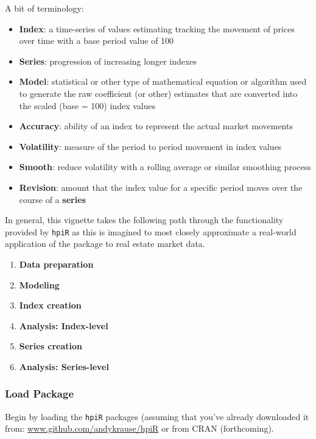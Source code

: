 \documentclass[]{article}
\providecommand{\tightlist}{%
  \setlength{\itemsep}{0pt}\setlength{\parskip}{0pt}}
\begin{document}
A bit of terminology:

\begin{itemize}
\tightlist
\item
  \textbf{Index}: a time-series of values estimating tracking the
  movement of prices over time with a base period value of 100
\item
  \textbf{Series}: progression of increasing longer indexes\\
\item
  \textbf{Model}: statistical or other type of mathematical equation or
  algorithm used to generate the raw coefficient (or other) estimates
  that are converted into the scaled (base = 100) index values
\item
  \textbf{Accuracy}: ability of an index to represent the actual market
  movements
\item
  \textbf{Volatility}: measure of the period to period movement in index
  values
\item
  \textbf{Smooth}: reduce volatility with a rolling average or similar
  smoothing process
\item
  \textbf{Revision}: amount that the index value for a specific period
  moves over the course of a \textbf{series}
\end{itemize}

In general, this vignette takes the following path through the
functionality provided by \texttt{hpiR} as this is imagined to most
closely approximate a real-world application of the package to real
estate market data.

\begin{enumerate}
\def\labelenumi{\arabic{enumi}.}
\tightlist
\item
  \textbf{Data preparation}
\item
  \textbf{Modeling}
\item
  \textbf{Index creation}
\item
  \textbf{Analysis: Index-level}
\item
  \textbf{Series creation}
\item
  \textbf{Analysis: Series-level}
\end{enumerate}

\hypertarget{load-package}{%
\subsubsection{Load Package}\label{load-package}}

Begin by loading the \texttt{hpiR} packages (assuming that you've
already downloaded it from:
\href{https://www.github.com/andykrause/hpiR}{www.github.com/andykrause/hpiR}
or from CRAN (forthcoming).
\end{document}
